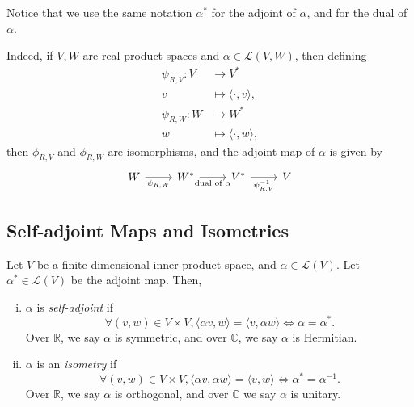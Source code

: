\documentclass[12pt]{article}
\begin{document}
\begin{remark}
	Notice that we use the same notation $\alpha^{\ast}$ for the adjoint of $\alpha$, and for the dual of $\alpha$.

	Indeed, if $V, W$ are real product spaces and $\alpha \in \mathcal{L}(V, W)$, then defining
	\begin{align*}
		\psi_{R,V} : V &\to V^{\ast} \\
		v &\mapsto \langle \cdot, v \rangle, \\
		\psi_{R,W} : W &\to W^{\ast} \\
		w &\mapsto \langle \cdot, w \rangle,
	\end{align*}
	then $\phi_{R,V}$ and $\phi_{R,W}$ are isomorphisms, and the adjoint map of $\alpha$ is given by
	\[
		\begin{tikzcd}
			W \arrow[r, "{\psi_{R, W}}", swap] & W^{\ast} \arrow[r, "{\text{dual of } \alpha}", swap] & V^{\ast} \arrow[r, "{\psi_{R,V}^{-1}}", swap] & V
		\end{tikzcd}
	\] 
\end{remark}

\subsection{Self-adjoint Maps and Isometries}
\label{sub:self_adjoint_maps_and_isometries}

\begin{definition}
	Let $V$ be a finite dimensional inner product space, and $\alpha \in \mathcal{L}(V)$. Let $\alpha^{\ast} \in \mathcal{L}(V)$ be the adjoint map. Then,
	\begin{enumerate}[(i)]
		\item $\alpha$ is \textit{self-adjoint} if
			\[
			\forall (v, w) \in V \times V, \langle \alpha v, w \rangle = \langle v, \alpha w \rangle \iff \alpha = \alpha^{\ast}
		.\]
		Over $\mathbb{R}$, we say $\alpha$ is symmetric, and over $\mathbb{C}$, we say $\alpha$ is Hermitian.
	\item $\alpha$ is an \textit{isometry} if
		\[
		\forall (v, w) \in V \times V, \langle \alpha v, \alpha w \rangle = \langle v, w \rangle \iff \alpha^{\ast} = \alpha^{-1}
		.\]
		Over $\mathbb{R}$, we say $\alpha$ is orthogonal, and over $\mathbb{C}$ we say $\alpha$ is unitary.
	\end{enumerate}
\end{definition}
\end{document}
